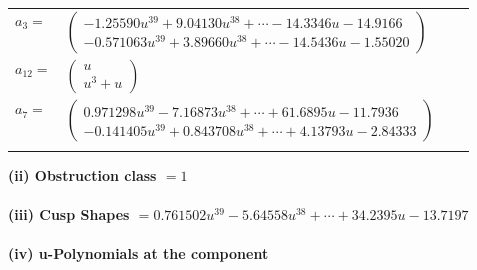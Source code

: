 \documentclass[1p]{elsarticle_modified}
\theoremstyle{definition}
\begin{document}
\begin{tabular}{m{7pt} m{180pt} m{7pt} m{180pt} }
\flushright $a_{3}=$&$\begin{pmatrix}-1.25590 u^{39}+9.04130 u^{38}+\cdots-14.3346 u-14.9166\\-0.571063 u^{39}+3.89660 u^{38}+\cdots-14.5436 u-1.55020\end{pmatrix}$ \\
\flushright $a_{12}=$&$\begin{pmatrix}u\\u^3+u\end{pmatrix}$ \\
\flushright $a_{7}=$&$\begin{pmatrix}0.971298 u^{39}-7.16873 u^{38}+\cdots+61.6895 u-11.7936\\-0.141405 u^{39}+0.843708 u^{38}+\cdots+4.13793 u-2.84333\end{pmatrix}$\\&\end{tabular}
\flushleft \textbf{(ii) Obstruction class $= 1$}\\~\\
\flushleft \textbf{(iii) Cusp Shapes $= 0.761502 u^{39}-5.64558 u^{38}+\cdots+34.2395 u-13.7197$}\\~\\
\newpage\renewcommand{\arraystretch}{1}
\flushleft \textbf{(iv) u-Polynomials at the component}\newline \\
\end{document}
